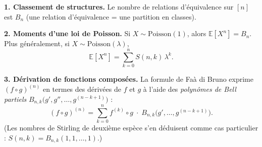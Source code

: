 \decsep{}



\begin{mdframed}[style=exbar]
  \textbf{1. Classement de structures.}\enspace%
  Le nombre de relations d'équivalence sur $[n]$ est $B_n$
  (une relation d'équivalence = une partition en classes).

  \smallskip\noindent
  \textbf{2. Moments d'une loi de Poisson.}\enspace%
  Si $X \sim \mathrm{Poisson}(1)$, alors $\mathbb{E}[X^n] = B_n$.
  Plus généralement, si $X \sim \mathrm{Poisson}(\lambda)$,
  \[
    \mathbb{E}[X^n] = \sum_{k=0}^{n} S(n,k)\,\lambda^k.
  \]

  \smallskip\noindent
  \textbf{3. Dérivation de fonctions composées.}\enspace%
  La formule de Fa\`a di Bruno exprime ${(f \circ g)}^{(n)}$ en termes
  des dérivées de $f$ et $g$ à l'aide des \emph{polynômes de Bell partiels}
  $B_{n,k}\bigl(g',g'',\ldots,g^{(n-k+1)}\bigr)$ :
  \[
    {(f\circ g)}^{(n)}
      = \sum_{k=0}^{n} f^{(k)}\!\circ g \;\cdot\;
        B_{n,k}\bigl(g',\ldots,g^{(n-k+1)}\bigr).
  \]
  (Les nombres de Stirling de deuxième espèce s'en déduisent comme cas
  particulier : $S(n,k)=B_{n,k}(1,1,\ldots,1)$.)
\end{mdframed}


